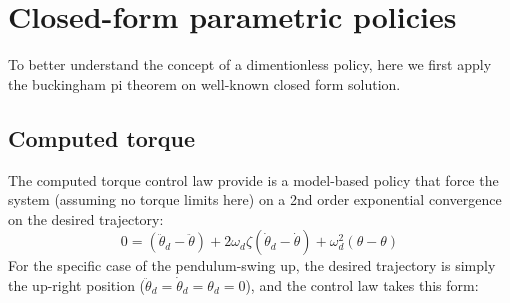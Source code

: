 \newpage
\section{Closed-form parametric policies}

To better understand the concept of a dimentionless policy, here we first apply the buckingham pi theorem on well-known closed form solution.

\subsection{Computed torque}

The computed torque control law provide is a model-based policy that force the system (assuming no torque limits here) on a 2nd order exponential convergence on the desired trajectory:
\begin{equation}
0 = (\ddot{\theta}_d - \ddot{\theta})+ 2 \omega_d \zeta (\dot{\theta}_d - \dot{\theta}) + \omega_d^2 (\theta - \theta)
\end{equation}
For the specific case of the pendulum-swing up, the desired trajectory is simply the up-right position ($\ddot{\theta}_d = \dot{\theta}_d = \theta_d = 0$), and the control law takes this form:
